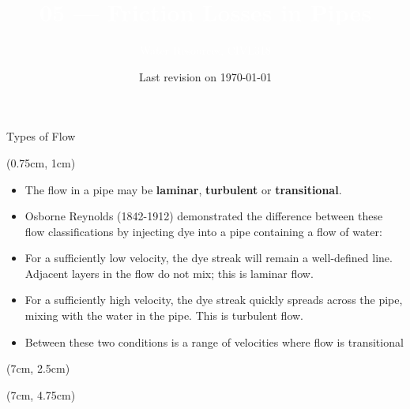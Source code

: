 \documentclass[9pt,xcolor={svgnames, x11names},professionalfonts, mathserif]{beamer}
\title[Friction Losses]{\Huge \textcolor{white}{05 --- Friction Losses in Pipes}}
\subtitle[CIVL318]{\Large\textcolor{white}{Water Resources, CIVL318}}
\author{}
\institute{}
\date{Last revision on \today}
\begin{document}
\begin{frame}[plain]    %
 \titlepage
\end{frame}


\begin{frame}{Types of Flow}

 \begin{textblock*}{1\columnwidth}(0.75cm, 1cm)
  \begin{itemize}
   \item<1-> The flow in a pipe may be \textbf{laminar}, \textbf{turbulent} or \textbf{transitional}.\parb
   \item<2-> Osborne Reynolds (1842-1912) demonstrated the difference between these flow classifications
   by injecting dye into a pipe containing a flow of water: \parb

   \item<3-> For a sufficiently low velocity,  the dye \newline streak  will remain a well-defined line.
   \newline Adjacent layers in the flow do not mix; \newline this is laminar flow.
   \parb
   \item<4-> For a sufficiently high velocity, the dye \newline streak quickly spreads across
   the pipe, \newline mixing with the water in the pipe. \newline This is turbulent flow.
   \parb
   \item<5-> Between these two conditions is a range of velocities where flow is transitional
  \end{itemize}
 \end{textblock*}


 \begin{textblock*}{5cm}(7cm, 2.5cm)
 \end{textblock*}

 \begin{textblock*}{5cm}(7cm, 4.75cm)
 \end{textblock*}
\end{frame}
\end{document}
